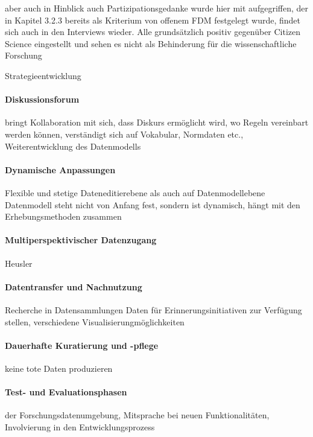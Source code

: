 aber auch in Hinblick auch Partizipationsgedanke wurde hier mit aufgegriffen, der in Kapitel 3.2.3 bereits als Kriterium von offenem FDM festgelegt wurde, findet sich auch in den Interviews wieder. Alle grundsätzlich positiv gegenüber Citizen Science eingestellt und sehen es nicht als Behinderung für die wissenschaftliche Forschung 

Strategieentwicklung

\paragraph{Diskussionsforum}
bringt Kollaboration mit sich, dass Diskurs ermöglicht wird, wo Regeln vereinbart werden können, verständigt sich auf Vokabular, Normdaten etc., Weiterentwicklung des Datenmodells
\paragraph{Dynamische Anpassungen}
Flexible und stetige 
Dateneditierebene als auch auf Datenmodellebene
Datenmodell steht nicht von Anfang fest, sondern ist dynamisch, hängt mit den Erhebungsmethoden zusammen
\paragraph{Multiperspektivischer Datenzugang}
Heusler

\paragraph{Datentransfer und Nachnutzung}
Recherche in Datensammlungen
Daten für Erinnerungsinitiativen zur Verfügung stellen, verschiedene Visualisierungmöglichkeiten

\paragraph{Dauerhafte Kuratierung und -pflege}
keine tote Daten produzieren

\paragraph{Test- und Evaluationsphasen}
der Forschungsdatenumgebung, Mitsprache bei neuen Funktionalitäten, Involvierung in den Entwicklungsprozess
